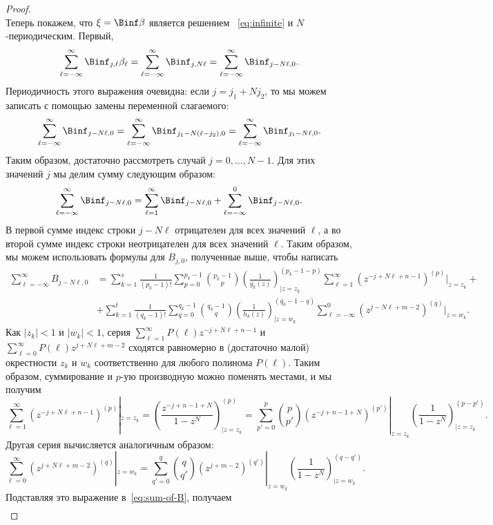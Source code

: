 \begin{proof}
\[	\]
	Теперь покажем, что $\xi = \Binf\beta$ является решением ~\eqref{eq:infinite} и $N$-периодическим.
	Первый,
	\[
	\sum_{\ell=-\infty}^{\infty} \Binf_{j,\ell} \beta_{\ell}
	=
	\sum_{\ell=-\infty}^{\infty}\Binf_{j, N\ell}
	= 
	\sum_{\ell=-\infty}^{\infty}\Binf_{j-N\ell, 0}.
	\]
	Периодичность этого выражения очевидна: если $j = j_1 + Nj_2$, то мы можем записать с помощью замены переменной слагаемого:
	\[
	\sum_{\ell=-\infty}^{\infty}\Binf_{j-N\ell, 0}
	=
	\sum_{\ell=-\infty}^{\infty}\Binf_{j_1-N(\ell-j_2), 0}
	=
	\sum_{\ell=-\infty}^{\infty}\Binf_{j_1-N\ell, 0}.
	\]
	Таким образом, достаточно рассмотреть случай $j = 0,\dots, N-1$.
	Для этих значений $j$ мы делим сумму следующим образом:
	\[
	\sum_{\ell=-\infty}^{\infty}\Binf_{j-N\ell, 0} 
	=
	\sum_{\ell=1}^{\infty}\Binf_{j-N\ell, 0}
	+
	\sum_{\ell=-\infty}^{0}\Binf_{j-N\ell, 0}.
	\]
	В первой сумме индекс строки $j - N\ell$ отрицателен для всех значений $\ell$, а во второй сумме индекс строки неотрицателен для всех значений $\ell$.
	Таким образом, мы можем использовать формулы для $B_{j,0}$, полученные выше, чтобы написать
	\begin{align}
	\sum_{\ell=-\infty}^{\infty}B_{j-N\ell, 0} 
	&=
	\sum_{k=1}^s\frac{1}{(p_k - 1)!}\sum_{p=0}^{p_k-1}\binom{p_k-1}{p}
	\left(\frac{1}{g_k(z)}\right)^{(p_k-1-p)}_{\big|{z=z_k}}
	\sum_{\ell=1}^{\infty}
	(z^{-j+N\ell+n-1})^{(p)}|_{z=z_k}  \nonumber
	+\\&+
	\sum_{k=1}^t\frac{1}{(q_k - 1)!}\sum_{q=0}^{q_k-1}\binom{q_k-1}{q}
	\left(\frac{1}{h_k(z)}\right)^{(q_k-1-q)}_{\big|{z=w_k}}
	\sum_{\ell=-\infty}^{0}
	(z^{j-N\ell+m-2})^{(q)}|_{z=w_k}. \label{eq:sum-of-B}
	\end{align}
	Как $|z_k| < 1$ и $|w_k| < 1$, серия
	$
	\sum_{\ell=1}^{\infty}
	P(\ell)z^{-j+N\ell+n-1}
	$
	и
	$
	\sum_{\ell=0}^{\infty}
	P(\ell)z^{j+N\ell+m-2}
	$
	сходятся равномерно в (достаточно малой) окрестности $z_k$ и $w_k$ соответственно для любого полинома $P(\ell)$.
	Таким образом, суммирование и $p$-ую производную можно поменять местами, и мы получим
	\[
	\sum_{\ell=1}^{\infty}
	(z^{-j+N\ell+n-1})^{(p)}|_{z=z_k}
	=
	\left(\frac{z^{-j+n-1+N}}{1-z^{N}}\right)^{(p)}_{\big|{z=z_k}}
	=
	\sum_{p'=0}^p\binom{p}{p'}(z^{-j+n-1+N})^{(p')}|_{z=z_k} \left(\frac{1}{1-z^{N}}\right)^{(p-p')}_{\big|{z=z_k}}.
	\]
	Другая серия вычисляется аналогичным образом:
	\[
	\sum_{\ell=0}^{\infty}
	(z^{j+N\ell+m-2})^{(q)}|_{z=w_k}
	=
	\sum_{q'=0}^q\binom{q}{q'}(z^{j+m-2})^{(q')}|_{z=w_k} \left(\frac{1}{1-z^{N}}\right)^{(q-q')}_{\big|{z=w_k}}.
	\]
	Подставляя это выражение в~\eqref{eq:sum-of-B}, получаем
	\begin{align*}

\end{align*}
\end{proof}

